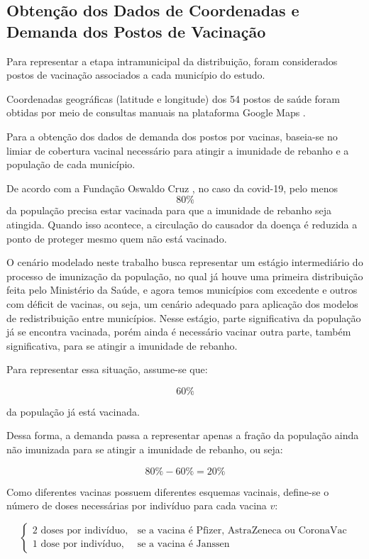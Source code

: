 \subsection{Obtenção dos Dados de Coordenadas e Demanda dos Postos de Vacinação}

Para representar a etapa intramunicipal da distribuição, foram considerados postos de vacinação associados a cada município do estudo.

Coordenadas geográficas (latitude e longitude) dos 54 postos de saúde foram obtidas por meio de consultas manuais na plataforma Google Maps \cite {GoogleMaps:2026}.

Para a obtenção dos dados de demanda dos postos por vacinas, baseia-se no limiar de cobertura vacinal necessário para atingir a imunidade de rebanho e a população de cada município.

De acordo com a Fundação Oswaldo Cruz \cite{fiocruz:2026}, no caso da covid-19, pelo menos
\[
80\%
\]
da população precisa estar vacinada para que a imunidade de rebanho seja atingida. Quando isso acontece, a circulação do causador da doença é reduzida a ponto de proteger mesmo quem não está vacinado.

O cenário modelado neste trabalho busca representar um estágio intermediário do processo de imunização da população, no qual já houve uma primeira distribuição feita pelo Ministério da Saúde, e agora temos municípios com excedente e outros com déficit de vacinas, ou seja, um cenário adequado para aplicação dos modelos de redistribuição entre municípios. Nesse estágio, parte significativa da população já se encontra vacinada, porém ainda é necessário vacinar outra parte, também significativa, para se atingir a imunidade de rebanho. 

Para representar essa situação, assume-se que:

\[
60\%
\]

da população já está vacinada.

Dessa forma, a demanda passa a representar apenas a fração da população ainda não imunizada para se atingir a imunidade de rebanho, ou seja:

\[
80\% - 60\% = 20\%
\]

Como diferentes vacinas possuem diferentes esquemas vacinais, define-se o número de doses necessárias por indivíduo para cada vacina $v$:

\[
\begin{cases}
2 \text{ doses por indivíduo}, & \text{se a vacina é Pfizer, AstraZeneca ou CoronaVac} \\
1 \text{ dose por indivíduo}, & \text{se a vacina é Janssen}
\end{cases}
\]


